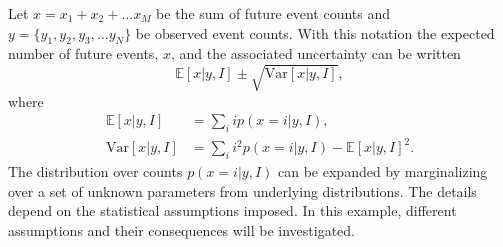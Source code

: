 \begin{example}
	\label{ex:events}
	Let $x=x_1+x_2+\dots x_M$ be the sum of future event counts and $y=\{y_1,y_2,y_3,\dots y_N\}$ be observed event counts. With this notation the expected number of future events, $x$, and the associated uncertainty can be written
	\begin{equation}
		\mathbb{E}[x|y,I]\pm \sqrt{\text{Var}[x|y,I]},
		\label{eq:mean_var}
	\end{equation}
	where
	\begin{equation}
		\begin{split}
			\mathbb{E}[x|y,I] &= \sum_i ip(x =i|y,I),\\
			\text{Var}[x|y,I] &=  \sum_i i^2p(x =i|y,I)-\mathbb{E}[x|y,I]^2.
		\end{split}
		\label{h1}
	\end{equation}
	The distribution over counts $p(x =i|y,I)$ can be expanded by marginalizing over a set of unknown parameters from underlying distributions. The details depend on the statistical assumptions imposed. In this example, different assumptions and their consequences will be investigated.
	

\end{example}
